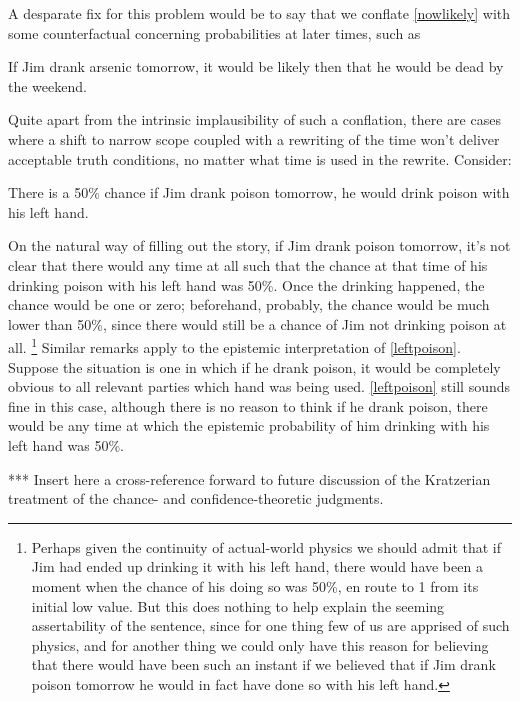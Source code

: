 \documentclass[If.tex]{subfiles}
\begin{document}
A desparate fix for this problem would be to say that we conflate \ref{nowlikely} with some counterfactual concerning probabilities at later times, such as
\begin{prop}
\nitem \label{wouldbelikelythen}
  If Jim drank arsenic tomorrow, it would be likely then that he would be dead by the weekend.
\end{prop}
Quite apart from the intrinsic implausibility of such a conflation, there are cases where a shift to narrow scope coupled with a rewriting of the time won't deliver acceptable truth conditions, no matter what time is used in the rewrite. Consider:
\begin{prop}
\nitem \label{leftpoison}
  There is a 50\% chance if Jim drank poison tomorrow, he would drink poison with his left hand.
\end{prop}
On the natural way of filling out the story, if Jim drank poison tomorrow, it's not clear that there would any time at all such that the chance at that time of his drinking poison with his left hand was 50\%. Once the drinking happened, the chance would be one or zero; beforehand, probably, the chance would be much lower than 50\%, since there would still be a chance of Jim not drinking poison at all.%
\footnote{Perhaps given the continuity of actual-world physics we should admit that if Jim had ended up drinking it with his left hand, there would have been a moment when the chance of his doing so was 50\%, en route to 1 from its initial low value. But this does nothing to help explain the seeming assertability of the sentence, since for one thing few of us are apprised of such physics, and for another thing we could only have this reason for believing that there would have been such an instant if we believed that if Jim drank poison tomorrow he would in fact have done so with his left hand.}
Similar remarks apply to the epistemic interpretation of \ref{leftpoison}. Suppose the situation is one in which if he drank poison, it would be completely obvious to all relevant parties which hand was being used. \ref{leftpoison} still sounds fine in this case, although there is no reason to think if he drank poison, there would be any time at which the epistemic probability of him drinking with his left hand was 50\%.

*** Insert here a cross-reference forward to future discussion of the Kratzerian treatment of the chance- and confidence-theoretic judgments.  
\end{document}
